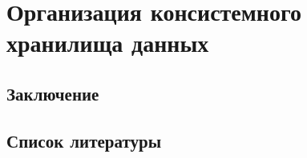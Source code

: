 
\chapter{Организация консистемного хранилища данных}
\section*{Заключение}
\section*{Список литературы}
